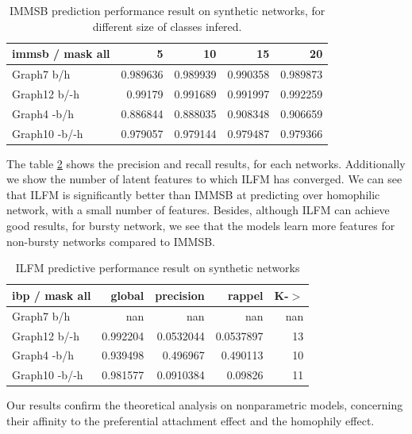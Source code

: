 \begin{table} \label{table:immsb}
\begin{tabular}{lrrrr}
\hline                                                                             
 immsb / mask all   &        5 &       10 &       15 &       20 \\                 
\hline                                                                             
 Graph7 b/h         & 0.989636 & 0.989939 & 0.990358 & 0.989873 \\                 
 Graph12 b/-h       & 0.99179  & 0.991689 & 0.991997 & 0.992259 \\                 
 Graph4 -b/h        & 0.886844 & 0.888035 & 0.908348 & 0.906659 \\                 
 Graph10 -b/-h      & 0.979057 & 0.979144 & 0.979487 & 0.979366 \\                 
\hline                                                                             
\end{tabular}  
    \caption{IMMSB prediction performance result on synthetic networks, for different size of classes infered.}
\end{table}


The table \ref{table:ibp} shows the precision and recall results, for each networks. Additionally we show the number of latent features to which ILFM has converged. We can see that ILFM is significantly better than IMMSB at predicting over homophilic network, with a small number of features. Besides, although ILFM can achieve good results, for bursty network, we see that the models learn more features for non-bursty networks compared to IMMSB. 

\begin{table} \label{table:ibp}
\begin{tabular}{lrrrr}
\hline
 ibp / mask all   &     global &   precision &      rappel &   K-\ensuremath{>} \\
\hline
 Graph7 b/h       & nan        & nan         & nan         &   nan \\
 Graph12 b/-h     &   0.992204 &   0.0532044 &   0.0537897 &    13 \\
 Graph4 -b/h      &   0.939498 &   0.496967  &   0.490113  &    10 \\
 Graph10 -b/-h    &   0.981577 &   0.0910384 &   0.09826   &    11 \\
\hline
\end{tabular}  
    \caption{ILFM predictive performance result on synthetic networks}
\end{table}

Our results confirm the theoretical analysis on nonparametric models, concerning their affinity to the preferential attachment effect and the homophily effect.





\clearpage



\clearpage
